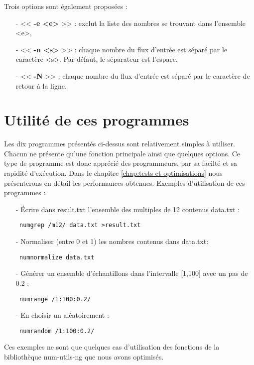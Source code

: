 \begin{itemize}
Trois options sont \'egalement propos\'ees :
\begin{itemize}
 \item[-] << \textbf{-e <e>} >> : exclut la liste des nombres se trouvant dans l'ensemble <e>,
 \item[-] << \textbf{-n <s>} >> : chaque nombre du flux d'entr\'ee est s\'epar\'e par le caract\`ere <s>. Par d\'efaut, le s\'eparateur est l'espace,
 \item[-] << \textbf{-N} >> : chaque nombre du flux d'entr\'ee est s\'epar\'e par le caract\`ere de retour \`a la ligne.
\end{itemize}
\end{itemize}

\section{Utilit\'e de ces programmes}

Les dix programmes pr\'esent\'es ci-dessus sont relativement simples \`a utiliser. Chacun ne pr\'esente qu'une fonction principale ainsi que quelques options.
Ce type de programme est donc appr\'eci\'e des programmeurs, par sa facilt\'e et sa rapidit\'e d'ex\'ecution. Dans le chapitre \ref{chap:tests et optimisations}
nous pr\'esenterons en d\'etail les performances obtenues.
\newline
Exemples d'utilisation de ces programmes :
\begin{itemize}
 \item[-] \'Ecrire dans result.txt l'ensemble des multiples de 12 contenus data.txt :
 \begin{verbatim} numgrep /m12/ data.txt >result.txt \end{verbatim}
 \item[-] Normaliser (entre 0 et 1) les nombres contenus dans data.txt:
 \begin{verbatim} numnormalize data.txt \end{verbatim}
 \item[-] G\'en\'erer un ensemble d'\'echantillons dans l'intervalle [1,100] avec un pas de 0.2 :
 \begin{verbatim} numrange /1:100:0.2/ \end{verbatim}
 \item[-] En choisir un al\'eatoirement :
 \begin{verbatim} numrandom /1:100:0.2/ \end{verbatim}
\end{itemize}

Ces exemples ne sont que quelques cas d'utilisation des fonctions de la biblioth\`eque num-utils-ng que nous avons optimis\'es.


